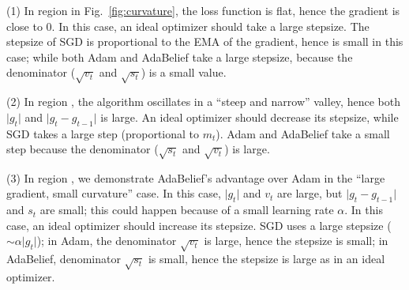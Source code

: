 \documentclass{article}
\newcommand*\circled[1]{\tikz[baseline=(char.base)]{
    \node[shape=circle, draw, inner sep=0pt, 
        minimum height=8pt] (char) {\vphantom{1g}#1};}}
\begin{document}

(1) In region \circled{1} in Fig.~\ref{fig:curvature}, the loss function is flat, hence the gradient is close to 0. In this case, an ideal optimizer should take a large stepsize. The stepsize of SGD is proportional to the EMA of the gradient, hence is small in this case; while both Adam and AdaBelief take a large stepsize, because the denominator ($\sqrt{v_t}$ and $\sqrt{s_t}$) is a small value.

(2) In region \circled{2}, the algorithm oscillates in a ``steep and narrow'' valley, hence both $\vert g_t \vert$ and $\vert g_t - g_{t-1} \vert$ is large. An ideal optimizer should decrease its stepsize, while SGD takes a large step (proportional to $m_t$). Adam and AdaBelief take a small step because the denominator ($\sqrt{s_t}$ and $\sqrt{v_t}$) is large.

(3) In region \circled{3}, we demonstrate AdaBelief's advantage over Adam in the ``large gradient, small curvature'' case. In this case, $\vert g_t \vert$ and $v_t$ are large, but $\vert g_t - g_{t-1} \vert$ and $s_t$ are small; this could happen because of a small learning rate $\alpha$. In this case, an ideal optimizer should increase its stepsize. SGD uses a large stepsize ($\sim \alpha \vert g_t \vert$); in Adam, the denominator $\sqrt{v_t}$ is large, hence the stepsize is small; in AdaBelief, denominator $\sqrt{s_t}$ is small, hence the stepsize is large as in an ideal optimizer.

\end{document}
